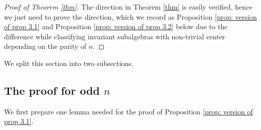 \documentclass[12pt]{amsart}
\theoremstyle{definition}
\theoremstyle{remark}
\begin{document}
\begin{proof}[Proof of Theorem \ref{thm}]
    The  direction in Theorem \ref{thm} is easily verified, hence we just need to prove the  direction, which we record as  Proposition \ref{prop: version of prop 3.1} and Proposition \ref{prop: version of prop 3.2} below
due to the difference while classifying invariant subalgebras with non-trivial center depending on the parity of $n$.
\end{proof} 
We split this section into two subsections.


\subsection{The proof for odd $n$}

We first prepare one lemma needed for the proof of Proposition \ref{prop: version of prop 3.1}.
\end{document}
